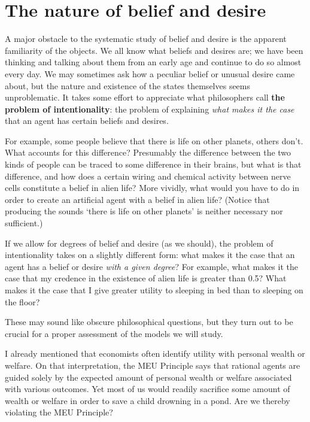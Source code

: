 

\section{The nature of belief and desire}

A major obstacle to the systematic study of belief and desire is the
apparent familiarity of the objects. We all know what beliefs and
desires are; we have been thinking and talking about them from an
early age and continue to do so almost every day. We may sometimes ask
how a peculiar belief or unusual desire came about, but the nature and
existence of the states themselves seems unproblematic. It takes some
effort to appreciate what philosophers call \textbf{the problem of
  intentionality}: the problem of explaining \emph{what makes it the
  case} that an agent has certain beliefs and desires. 

For example, some people believe that there is life on other planets,
others don't. What accounts for this difference? Presumably the
difference between the two kinds of people can be traced to some
difference in their brains, but what is that difference, and how does
a certain wiring and chemical activity between nerve cells constitute
a belief in alien life? More vividly, what would you have to do in
order to create an artificial agent with a belief in alien life?
(Notice that producing the sounds `there is life on other planets' is
neither necessary nor sufficient.)

If we allow for degrees of belief and desire (as we should), the
problem of intentionality takes on a slightly different form: what
makes it the case that an agent has a belief or desire \emph{with a
  given degree}? For example, what makes it the case that my credence
in the existence of alien life is greater than 0.5? What makes it the
case that I give greater utility to sleeping in bed than to sleeping
on the floor?

These may sound like obscure philosophical questions, but they turn
out to be crucial for a proper assessment of the models we will study.

I already mentioned that economists often identify utility with
personal wealth or welfare. On that interpretation, the MEU
Principle says that rational agents are guided solely by the expected
amount of personal wealth or welfare associated with various
outcomes. Yet most of us would readily sacrifice some amount of wealth
or welfare in order to save a child drowning in a pond. Are we
thereby violating the MEU Principle? 

